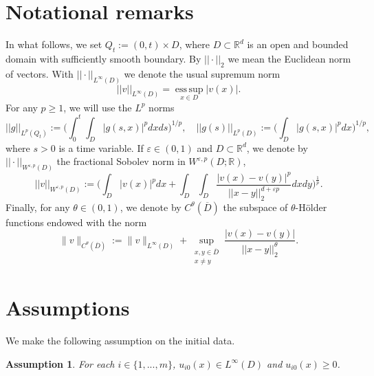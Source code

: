 \documentclass[12pt]{article}
\newtheorem{assumption}{Assumption}
\theoremstyle{definition}
\theoremstyle{remark}
\begin{document}
\section{Notational remarks}
In what follows, we set $Q_t := (0,t)\times D$, where $D\subset \mathbb R^d$ is an open and bounded domain with sufficiently smooth boundary. By $||\cdot||_2$ we mean the Euclidean norm of vectors. With $||\cdot||_{L^{\infty}(D)}$ we denote the usual supremum norm
\[
||v||_{L^{\infty}(D)} = \operatorname*{ess\,sup}_{x \in D} |v(x)|.
\]
For any $p\geq 1$, we will use the $L^p$ norms
\[
||g||_{L^p(Q_t)} := \Bigg (\int_0^t\int_D |g(s,x)|^pdxds\Bigg)^{1/p},\quad ||g(s)||_{L^p(D)} := \Bigg(\int_D |g(s,x)|^pdx\Bigg)^{1/p},
\]
where $s > 0$ is a time variable. If $\varepsilon \in (0,1)$ and $D\subset \mathbb R^d$, we denote by $||\cdot||_{W^{\varepsilon,p}(D)}$ the fractional Sobolev norm in $W^{\varepsilon,p}(D;\mathbb R)$,
\[
||v||_{W^{\varepsilon,p}(D)} := \Bigg(\int_D |v(x)|^p dx + \int_D\int_D \frac{|v(x)-v(y)|^p}{||x-y||_2^{d+\varepsilon p}}dxdy\Bigg)^{\frac{1}{p}}.
\]
Finally, for any $\theta\in (0,1)$, we denote by $C^{\theta}(\overline{D})$ the subspace of $\theta$-H\"older functions endowed with the norm
\[
\|v\|_{C^\theta(\overline D)}
:=
\|v\|_{L^\infty(D)} + \sup_{\substack{x,y \in \overline D \\ x \neq y}}
\frac{|v(x)-v(y)|}{||x-y||_2^\theta}.
\]
\section{Assumptions}\label{section: assumptions}
We make the following assumption on the initial data.
\begin{assumption}\label{assump: initial data are >= 0 and in L^oo}
    For each $i\in \{1,...,m\}$, $u_{i0}(x)\in L^{\infty}(D)$ and $u_{i0}(x)\geq 0$.
\end{assumption}
\end{document}
